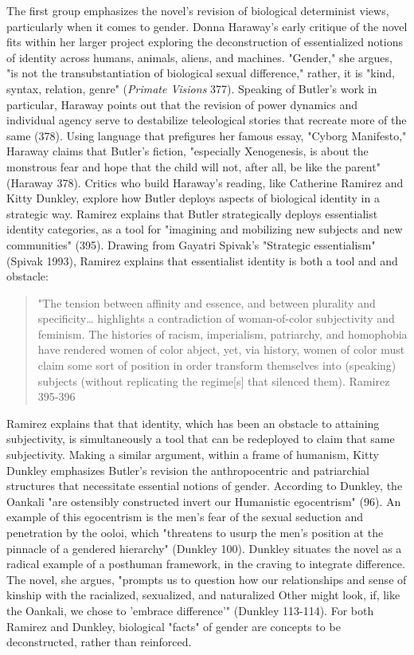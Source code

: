 \documentclass[11pt]{article}
\begin{document}
\begin{enumerate}
The first group emphasizes the novel's revision of biological
determinist views, particularly when it comes to gender. Donna
Haraway's early critique of the novel fits within her larger project
exploring the deconstruction of essentialized notions of identity
across humans, animals, aliens, and machines. "Gender," she argues,
"is not the transubstantiation of biological sexual difference,"
rather, it is "kind, syntax, relation, genre" (\emph{Primate Visions}
377). Speaking of Butler's work in particular, Haraway points out that
the revision of power dynamics and individual agency serve to
destabilize teleological stories that recreate more of the same
(378). Using language that prefigures her famous essay, "Cyborg
Manifesto," Haraway claims that Butler's fiction, "especially
Xenogenesis, is about the monstrous fear and hope that the child will
not, after all, be like the parent" (Haraway 378). Critics who build
Haraway's reading, like Catherine Ramirez and Kitty Dunkley, explore
how Butler deploys aspects of biological identity in a strategic way.
Ramirez explains that Butler strategically deploys essentialist
identity categories, as a tool for "imagining and mobilizing new
subjects and new communities" (395). Drawing from Gayatri Spivak's
"Strategic essentialism" (Spivak 1993), Ramirez explains that
essentialist identity is both a tool and and obstacle:
\begin{quote}
"The tension between affinity and essence, and between plurality and
specificity\ldots{} highlights a contradiction of woman-of-color
subjectivity and feminism. The histories of racism, imperialism,
patriarchy, and homophobia have rendered women of color abject, yet,
via history, women of color must claim some sort of position in order
transform themselves into (speaking) subjects (without replicating the
regime[s] that silenced them). Ramirez 395-396
\end{quote}
Ramirez explains that that identity, which has been an obstacle to
attaining subjectivity, is simultaneously a tool that can be
redeployed to claim that same subjectivity. Making a similar argument,
within a frame of humanism, Kitty Dunkley emphasizes Butler's revision
the anthropocentric and patriarchial structures that necessitate
essential notions of gender. According to Dunkley, the Oankali "are
ostensibly constructed invert our Humanistic egocentrism" (96). An
example of this egocentrism is the men's fear of the sexual seduction
and penetration by the ooloi, which "threatens to usurp the men’s
position at the pinnacle of a gendered hierarchy" (Dunkley
100). Dunkley situates the novel as a radical example of a posthuman
framework, in the craving to integrate difference. The novel, she
argues, "prompts us to question how our relationships and sense of
kinship with the racialized, sexualized, and naturalized Other might
look, if, like the Oankali, we chose to 'embrace difference'" (Dunkley
113-114). For both Ramirez and Dunkley, biological "facts" of gender
are concepts to be deconstructed, rather than reinforced.


\end{enumerate}
\end{document}
